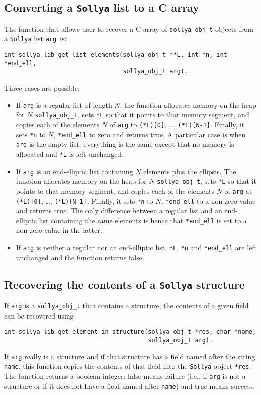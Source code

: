 \documentclass[a4paper]{article}
\newcommand{\sollya}{\texttt{Sollya}\xspace}
\begin{document}
\subsection{Converting a \sollya list to a C array}
The function that allows user to recover a C array of \verb|sollya_obj_t| objects from a \sollya list \verb|arg|~is:\\
\begin{center}
\verb|int sollya_lib_get_list_elements(sollya_obj_t **L, int *n, int *end_ell,|\\
\verb|                                 sollya_obj_t arg).                      |
\end{center}
Three cases are possible:
\begin{itemize}
\item If \verb|arg| is a regular list of length $N$, the function allocates memory on the heap for $N$ \verb|sollya_obj_t|, sets \verb|*L| so that it points to that memory segment, and copies each of the elements $N$ of \verb|arg| to \verb|(*L)[0]|, \dots, \verb|(*L)[N-1]|. Finally, it sets \verb|*n| to $N$, \verb|*end_ell| to zero and returns true. A particular case is when \verb|arg| is the empty list: everything is the same except that no memory is allocated and \verb|*L| is left unchanged.
\item If \verb|arg| is an end-elliptic list containing $N$ elements plus the ellipsis. The function allocates memory on the heap for $N$ \verb|sollya_obj_t|, sets \verb|*L| so that it points to that memory segment, and copies each of the elements $N$ of \verb|arg| at \verb|(*L)[0]|, \dots, \verb|(*L)[N-1]|. Finally, it sets \verb|*n| to $N$, \verb|*end_ell| to a non-zero value and returns true. The only difference between a regular list and an end-elliptic list containing the same elements is hence that \verb|*end_ell| is set to a non-zero value in the latter.
\item If \verb|arg| is neither a regular nor an end-elliptic list, \verb|*L|, \verb|*n| and \verb|*end_ell| are left unchanged and the function returns false.
\end{itemize}

\subsection{Recovering the contents of a \sollya structure}
If \verb|arg| is a \verb|sollya_obj_t| that contains a structure, the contents of a given field can be recovered using
\begin{center}
\verb|int sollya_lib_get_element_in_structure(sollya_obj_t *res, char *name,|\\
\verb|                                        sollya_obj_t arg).             |
\end{center}
If \verb|arg| really is a structure and if that structure has a field named after the string \verb|name|, this function copies the contents of that field into the \sollya object \verb|*res|. The function returns a boolean integer: false means failure (i.e., if \verb|arg| is not a structure or if it does not have a field named after \verb|name|) and true means success.
\end{document}
